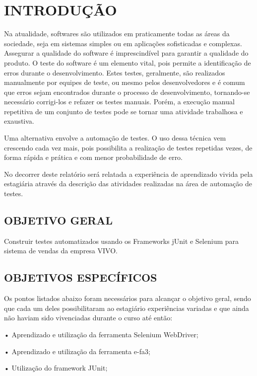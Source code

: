 \newpage
\section{INTRODUÇÃO}


\indent Na atualidade, softwares são utilizados em praticamente todas as áreas da sociedade, seja em sistemas simples ou em aplicações sofisticadas e complexas. Assegurar a qualidade do software é imprescindível para garantir a qualidade do produto. O teste do software é um elemento vital, pois permite a identificação de erros durante o desenvolvimento. Estes testes, geralmente, são realizados manualmente por equipes de teste, ou mesmo pelos desenvolvedores e é comum que erros sejam encontrados durante o processo de desenvolvimento, tornando-se necessário corrigi-los e refazer os testes manuais. Porém, a execução manual repetitiva de um conjunto de testes pode se tornar uma atividade trabalhosa e exaustiva.

Uma alternativa envolve a automação de testes. O uso dessa técnica vem crescendo cada vez mais, pois possibilita a realização de testes repetidas vezes, de forma rápida e prática e com menor probabilidade de erro. \nocite{Bernardo2011}

No decorrer deste relatório será relatada a experiência de aprendizado vivida pela estagiária através da descrição das atividades realizadas na área de automação de testes.

\subsection{OBJETIVO GERAL}
Construir testes automatizados usando os Frameworks jUnit e Selenium para sistema de vendas da empresa VIVO.

\subsection{OBJETIVOS ESPECÍFICOS}
Os pontos listados abaixo foram necessários para alcançar o objetivo geral, sendo que cada um deles possibilitaram ao estagiário experiências variadas e que ainda não haviam sido vivenciadas durante o curso até então:

•	Aprendizado e utilização da ferramenta Selenium WebDriver;

•	Aprendizado e utilização da ferramenta e-fa3;

•	Utilização do framework JUnit;

